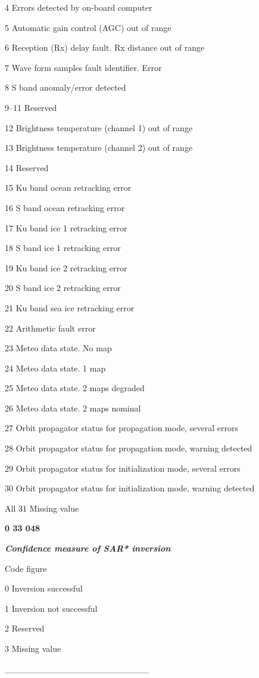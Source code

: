 4 Errors detected by on-board computer

5 Automatic gain control (AGC) out of range

6 Reception (Rx) delay fault. Rx distance out of range

7 Wave form samples fault identifier. Error

8 S band anomaly/error detected

9--11 Reserved

12 Brightness temperature (channel 1) out of range

13 Brightness temperature (channel 2) out of range

14 Reserved

15 Ku band ocean retracking error

16 S band ocean retracking error

17 Ku band ice 1 retracking error

18 S band ice 1 retracking error

19 Ku band ice 2 retracking error

20 S band ice 2 retracking error

21 Ku band sea ice retracking error

22 Arithmetic fault error

23 Meteo data state. No map

24 Meteo data state. 1 map

25 Meteo data state. 2 maps degraded

26 Meteo data state. 2 maps nominal

27 Orbit propagator status for propagation mode, several errors

28 Orbit propagator status for propagation mode, warning detected

29 Orbit propagator status for initialization mode, several errors

30 Orbit propagator status for initialization mode, warning detected

All 31 Missing value

\textbf{0 33 048}

\emph{\textbf{Confidence measure of SAR* inversion}}

Code figure

0 Inversion successful

1 Inversion not successful

2 Reserved

3 Missing value

\_\_\_\_\_\_\_\_\_\_\_\_\_\_\_\_\_\_\_\_\_\_\_

